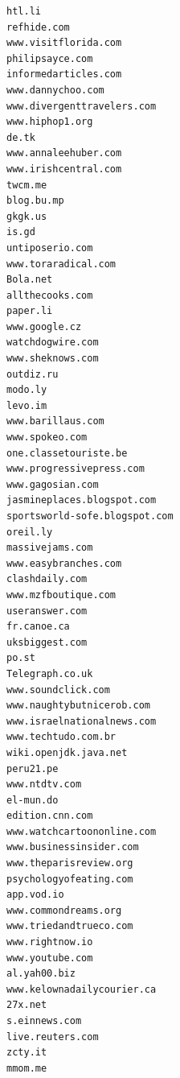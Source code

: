 \documentclass{article}
\begin{document}
\begin{verbatim}
htl.li
refhide.com
www.visitflorida.com
philipsayce.com
informedarticles.com
www.dannychoo.com
www.divergenttravelers.com
www.hiphop1.org
de.tk
www.annaleehuber.com
www.irishcentral.com
twcm.me
blog.bu.mp
gkgk.us
is.gd
untiposerio.com
www.toraradical.com
Bola.net
allthecooks.com
paper.li
www.google.cz
watchdogwire.com
www.sheknows.com
outdiz.ru
modo.ly
levo.im
www.barillaus.com
www.spokeo.com
one.classetouriste.be
www.progressivepress.com
www.gagosian.com
jasmineplaces.blogspot.com
sportsworld-sofe.blogspot.com
oreil.ly
massivejams.com
www.easybranches.com
clashdaily.com
www.mzfboutique.com
useranswer.com
fr.canoe.ca
uksbiggest.com
po.st
Telegraph.co.uk
www.soundclick.com
www.naughtybutnicerob.com
www.israelnationalnews.com
www.techtudo.com.br
wiki.openjdk.java.net
peru21.pe
www.ntdtv.com
el-mun.do
edition.cnn.com
www.watchcartoononline.com
www.businessinsider.com
www.theparisreview.org
psychologyofeating.com
app.vod.io
www.commondreams.org
www.triedandtrueco.com
www.rightnow.io
www.youtube.com
al.yah00.biz
www.kelownadailycourier.ca
27x.net
s.einnews.com
live.reuters.com
zcty.it
mmom.me
\end{verbatim}
\end{document}
